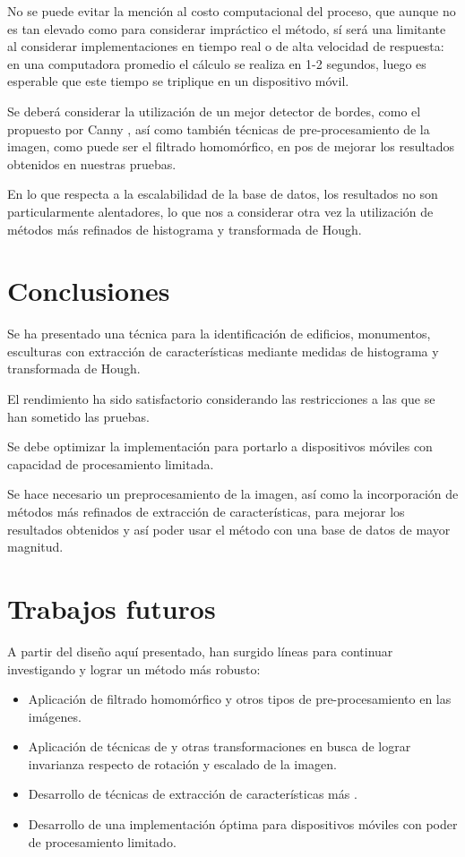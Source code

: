 \documentclass[conference,a4paper,10pt,oneside,final]{tfmpd}
\begin{document}
No se puede evitar la mención al costo computacional del proceso, que aunque
no es tan elevado como para considerar impráctico el método, sí será una
limitante al considerar implementaciones en tiempo real o de alta velocidad
de respuesta: en una computadora promedio el cálculo se realiza en 1-2 segundos,
luego es esperable que este tiempo se triplique en un dispositivo móvil.

Se deberá considerar la utilización de un mejor detector de bordes, como el
propuesto por Canny \cite{canny},
así como también técnicas de pre-procesamiento de la
imagen, como puede ser el filtrado homomórfico, en pos de mejorar los
resultados obtenidos en nuestras pruebas.

En lo que respecta a la escalabilidad de la base de datos, los resultados no
son particularmente alentadores, lo que nos  a considerar otra vez la
utilización de métodos más refinados de histograma y transformada de Hough.
%
%
%
%
\section{Conclusiones}
Se ha presentado una técnica para la identificación de edificios, monumentos,
esculturas con extracción de características mediante medidas de histograma
y transformada de Hough.

El rendimiento ha sido satisfactorio considerando las restricciones a las
que se han sometido las pruebas.

Se debe optimizar la implementación para portarlo a dispositivos móviles
con capacidad de procesamiento limitada.

Se hace necesario un preprocesamiento de la imagen, así como la incorporación
de métodos más refinados de extracción de características, para mejorar los
resultados obtenidos y así poder usar el método con una base de datos de
mayor magnitud.
%
%
%
%
\section{Trabajos futuros}
A partir del diseño aquí presentado, han surgido líneas para continuar
investigando y lograr un método más robusto:
\begin{itemize}
\item Aplicación de filtrado homomórfico y otros tipos de
      pre-procesamiento en las imágenes.
\item Aplicación de técnicas de  y otras transformaciones en busca
      de lograr invarianza respecto de rotación y escalado de la imagen.
\item Desarrollo de técnicas de extracción de características más
      .
\item Desarrollo de una implementación óptima para dispositivos móviles con
      poder de procesamiento limitado.
\end{itemize}
\nocite{*}


\end{document}
